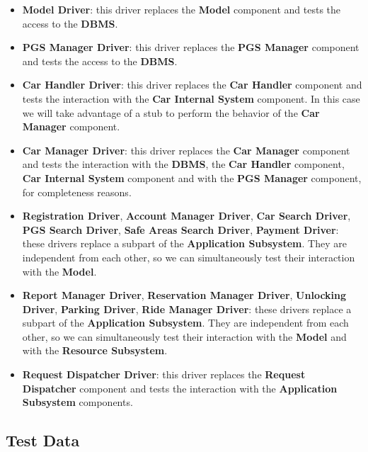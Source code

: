 \documentclass[english]{article}
\begin{document}
\begin{itemize}
	\item{\textbf{Model Driver}: this driver replaces the \textbf{Model} component and tests the access to the \textbf{DBMS}.}
	
	\item{\textbf{PGS Manager Driver}: this driver replaces the \textbf{PGS Manager} component and tests the access to the \textbf{DBMS}.}
	
	\item{\textbf{Car Handler Driver}: this driver replaces the \textbf{Car Handler} component and tests the interaction with the \textbf{Car Internal System} component. In this case we will take advantage of a stub to perform the behavior of the \textbf{Car Manager} component.}
	
	\item{\textbf{Car Manager Driver}: this driver replaces the \textbf{Car Manager} component and tests the interaction with the \textbf{DBMS}, the \textbf{Car Handler} component, \textbf{Car Internal System} component and with the \textbf{PGS Manager} component, for completeness reasons.}

	\item{\textbf{Registration Driver}, \textbf{Account Manager Driver}, \textbf{Car Search Driver}, \textbf{PGS Search Driver}, \textbf{Safe Areas Search Driver}, \textbf{Payment Driver}: these drivers replace a subpart of the \textbf{Application Subsystem}. They are independent from each other, so we can simultaneously test their interaction with the \textbf{Model}.}

	\item{\textbf{Report Manager Driver}, \textbf{Reservation Manager Driver}, \textbf{Unlocking Driver}, \textbf{Parking Driver}, \textbf{Ride Manager Driver}: these drivers replace a subpart of the \textbf{Application Subsystem}. They are independent from each other, so we can simultaneously test their interaction with the \textbf{Model} and with the \textbf{Resource Subsystem}.}

	\item{\textbf{Request Dispatcher Driver}: this driver replaces the \textbf{Request Dispatcher} component and tests the interaction with the \textbf{Application Subsystem} components.}

\end{itemize}

\newpage
\subsection{Test Data}
 
\end{document}
